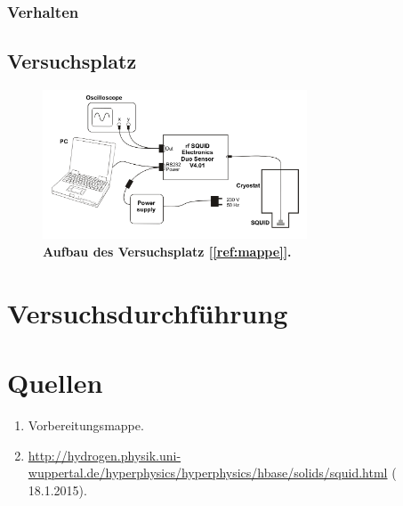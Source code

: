 \documentclass[a4paper,ngerman]{scrartcl}
\begin{document}
\subsubsection{Verhalten}

\subsection{Versuchsplatz}

\begin{figure}
\centering
\includegraphics[width=0.7\textwidth]{abbildungen/aufbau_versuchsplatz.png}
\caption[Versuchsplatz]{\textbf{Aufbau des Versuchsplatz [\ref{ref:mappe}].}}
\label{fig:Versuchsplatz}
\end{figure}



\section{Versuchsdurchführung}


\section{Quellen}
\begin{enumerate}
\item Vorbereitungsmappe.\label{ref:mappe}
\item \url{http://hydrogen.physik.uni-wuppertal.de/hyperphysics/hyperphysics/hbase/solids/squid.html} ( 18.1.2015).\label{ref:wuppertal}
\end{enumerate}
\end{document}
